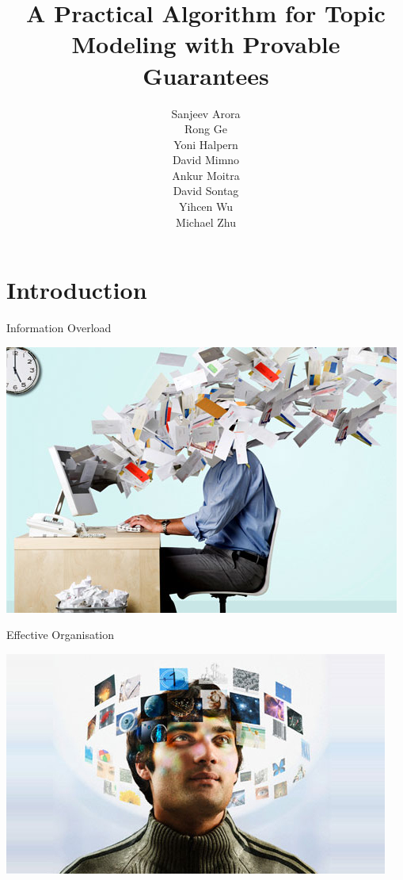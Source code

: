 \documentclass{lecture}
\title{A Practical Algorithm for Topic Modeling with Provable Guarantees}
\author[Vanush \& Kristy]{Sanjeev Arora\\
		Rong Ge\\
		Yoni Halpern\\
		David Mimno\\
		Ankur Moitra\\
		David Sontag\\
		Yihcen Wu\\
		Michael Zhu}
\institute[\textschwa-lab]{Presented by: Vanush Vaswani and Kristy Hughes}
\date{}
\begin{document}
\AtBeginSection[]
{
  \begin{frame}
    \tableofcontents[currentsection]
  \end{frame}
}

\titleslide

\section[Intro]{Introduction}

\begin{plain}{Information Overload}
\vspace{-2ex}
\begin{center}
\includegraphics[scale=0.6]{figs/messy}
\end{center}
\end{plain}

\begin{plain}{Effective Organisation}
\vspace{-4ex}
\begin{center}
\includegraphics[scale=0.65]{figs/organised}
\end{center}
\end{plain}
\end{document}
